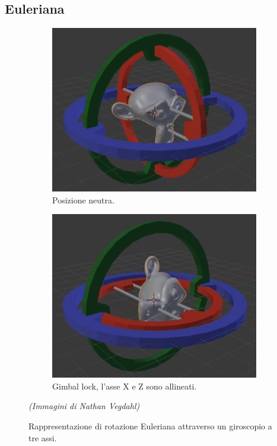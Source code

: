 \subsection{Euleriana}

\begin{figure}
\centering
\begin{subfigure}{.5\textwidth}
  \centering
  \includegraphics[width=.9\linewidth]{Figures/euler-1.jpg}
  \caption{Posizione neutra.}
  \label{fig:eulerA}
\end{subfigure}%
\begin{subfigure}{.5\textwidth}
  \centering
  \includegraphics[width=.9\linewidth]{Figures/euler-2.jpg}
  \caption{Gimbal lock, l'asse X e Z sono allineati.}
  \label{fig:eulerB}
\end{subfigure}
\decoRule
\caption[Rotazione Euleriana]{Rappresentazione di rotazione Euleriana attraverso un giroscopio a tre assi.}
  \begin{minipage}{.8\textwidth}
  \footnotesize
  \emph{(Immagini di Nathan Vegdahl)}
  \end{minipage}
\label{fig:euler}
\end{figure}

